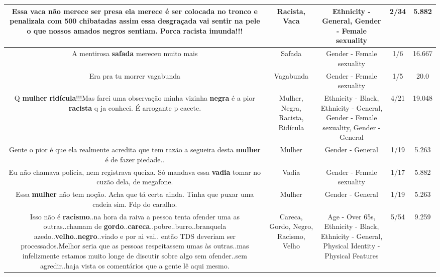 \documentclass[11pt]{article}
\newlength\mylength
\begin{document}
\begin{center}
\begin{longtable}{|C{.65\mylength}|C{.30\mylength}|C{.12\mylength}|C{.12\mylength}|C{.12\mylength}|}
  \small Essa \textbf{vaca} não merece ser presa ela merece é ser colocada no tronco e penalizala com 500 chibatadas  assim essa desgraçada vai sentir na pele o que nossos amados negros sentiam. Porca \textbf{racista} imunda!!!\normalsize   & Racista, Vaca & Ethnicity - General, Gender - Female sexuality & 2/34 & 5.882 \\  \hline
  \small A mentirosa \textbf{safada} mereceu muito mais\normalsize   & Safada & Gender - Female sexuality & 1/6 & 16.667 \\  \hline
  \small Era pra tu morrer vagabunda\normalsize   & Vagabunda & Gender - Female sexuality & 1/5 & 20.0 \\  \hline
  \small Q \textbf{mulher} \textbf{ridícula}!!!Mas farei uma observação minha vizinha \textbf{negra} é a pior \textbf{racista} q ja conheci. É arrogante p cacete.\normalsize   & Mulher, Negra, Racista, Ridícula & Ethnicity - Black, Ethnicity - General, Gender - Female sexuality, Gender - General & 4/21 & 19.048 \\  \hline
  \small Gente  o pior  é que  ela realmente  acredita que  tem  razão  a segueira  desta \textbf{mulher}  é de fazer  piedade..\normalsize   & Mulher & Gender - General & 1/19 & 5.263 \\  \hline
  \small Eu não chamava polícia, nem registrava queixa. Só mandava essa \textbf{vadia} tomar no cuzão dela, de megafone.\normalsize   & Vadia & Gender - Female sexuality & 1/17 & 5.882 \\  \hline
  \small Essa \textbf{mulher} não tem noção. Acha que tá certa ainda. Tinha que puxar uma cadeia sim. Fdp do caralho.\normalsize   & Mulher & Gender - General & 1/19 & 5.263 \\  \hline
  \small Isso não é \textbf{racismo}..na hora da raiva a pessoa tenta ofender uma as outras..chamam de \textbf{gordo}..\textbf{careca}..pobre..burro..branquela azedo..\textbf{velho}..\textbf{negro}..viado e por ai vai.. então TDS deveriam ser processados.Melhor seria que as pessoas respeitassem umas às outras..mas infelizmente estamos muito longe de discutir sobre algo sem ofender..sem agredir..haja vista os comentários que a gente lê aqui mesmo.\normalsize   & Careca, Gordo, Negro, Racismo, Velho & Age - Over 65s, Ethnicity - Black, Ethnicity - General, Physical Identity - Physical Features & 5/54 & 9.259 \\  \hline

\end{longtable}
\end{center}
\end{document}
